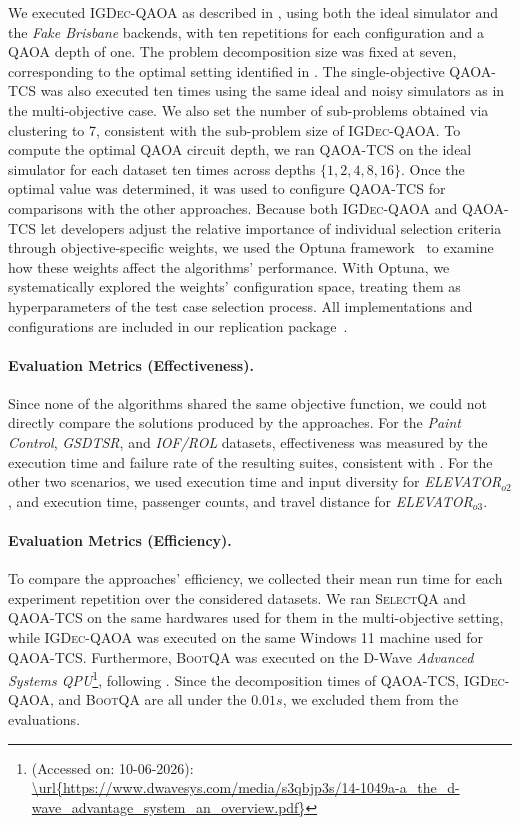 We executed \textsc{IGDec-QAOA} as described in \citet{igdec_qaoa}, using both the ideal simulator and the \textit{Fake Brisbane} backends, with ten repetitions for each configuration and a QAOA depth of one. The problem decomposition size was fixed at seven, corresponding to the optimal setting identified in \citet{igdec_qaoa}.
The single-objective \textsc{QAOA-TCS} was also executed ten times using the same ideal and noisy simulators as in the multi-objective case. We also set the number of sub-problems obtained via clustering to 7, consistent with the sub-problem size of \textsc{IGDec-QAOA}.
To compute the optimal QAOA circuit depth, we ran \textsc{QAOA-TCS} on the ideal simulator for each dataset ten times across depths $\{1,2,4,8,16\}$. Once the optimal value was determined, it was used to configure \textsc{QAOA-TCS} for comparisons with the other approaches.
Because both \textsc{IGDec-QAOA} and \textsc{QAOA-TCS} let developers adjust the relative importance of individual selection criteria through objective-specific weights, we used the Optuna framework~\citep{optuna_2019} to examine how these weights affect the algorithms' performance. With Optuna, we systematically explored the weights' configuration space, treating them as hyperparameters of the test case selection process.
All implementations and configurations are included in our replication package~\citep{appendix}.


\paragraph{Evaluation Metrics (Effectiveness).}
\label{sec:eval_metrics_2}
Since none of the algorithms shared the same objective function, we could not directly compare the solutions produced by the approaches.
For the \textit{Paint Control}, \textit{GSDTSR}, and \emph{IOF/ROL} datasets, effectiveness was measured by the execution time and failure rate of the resulting suites, consistent with \citet{bootqa,selectqa}.  
For the other two scenarios, we used execution time and input diversity for \emph{ELEVATOR$_{o2}$}, and execution time, passenger counts, and travel distance for \emph{ELEVATOR$_{o3}$}.

\paragraph{Evaluation Metrics (Efficiency).} To compare the approaches' efficiency, we collected their mean run time for each experiment repetition over the considered datasets. We ran \textsc{SelectQA} and \textsc{QAOA-TCS} on the same hardwares used for them in the multi-objective setting, while \textsc{IGDec-QAOA} was executed on the same Windows 11 machine used for \textsc{QAOA-TCS}. Furthermore,  \textsc{BootQA} was executed on the D-Wave \textit{Advanced Systems QPU}\footnote{(Accessed on: 10-06-2026): \url{\url{https://www.dwavesys.com/media/s3qbjp3s/14-1049a-a_the_d-wave_advantage_system_an_overview.pdf}}}, following \citet{bootqa}. Since the decomposition times of \textsc{QAOA-TCS}, \textsc{IGDec-QAOA}, and \textsc{BootQA} are all under the $0.01s$, we excluded them from the evaluations.

